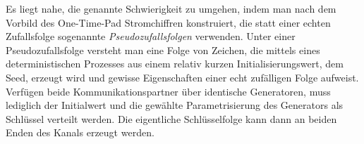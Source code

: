 %	
%
%
%
%
%

Es liegt nahe, die genannte Schwierigkeit zu umgehen, indem man nach dem Vorbild des One-Time-Pad Stromchiffren konstruiert, die statt einer echten Zufallsfolge sogenannte \emph{Pseudozufallsfolgen} \indexPNS verwenden. Unter einer Pseudozufallsfolge versteht man eine Folge von Zeichen, die mittels eines deterministischen Prozesses aus einem relativ kurzen Initialisierungswert, dem Seed\indexSeed, erzeugt wird und gewisse Eigenschaften einer echt zufälligen Folge aufweist. Verfügen beide Kommunikationspartner über identische Generatoren, muss lediglich der Initialwert und die gewählte Parametrisierung des Generators als Schlüssel verteilt werden. Die eigentliche Schlüsselfolge kann dann an beiden Enden des Kanals erzeugt werden.

